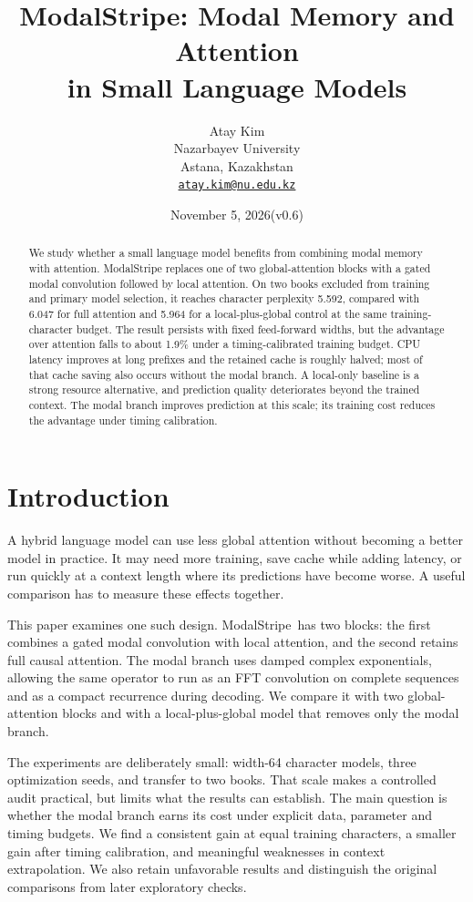 \documentclass[11pt,letterpaper]{article}
\title{ModalStripe: Modal Memory and Attention\\in Small Language Models}
\author{Atay Kim\\[3pt]\normalsize Nazarbayev University\\\normalsize Astana, Kazakhstan\\\normalsize\href{mailto:atay.kim@nu.edu.kz}{\texttt{atay.kim@nu.edu.kz}}}
\date{\small November 5, 2026\quad (v0.6)}
\newcommand{\model}{ModalStripe}
\begin{document}
\maketitle
\begin{abstract}
We study whether a small language model benefits from combining modal memory with attention. ModalStripe replaces one of two global-attention blocks with a gated modal convolution followed by local attention. On two books excluded from training and primary model selection, it reaches character perplexity 5.592, compared with 6.047 for full attention and 5.964 for a local-plus-global control at the same training-character budget. The result persists with fixed feed-forward widths, but the advantage over attention falls to about 1.9\% under a timing-calibrated training budget. CPU latency improves at long prefixes and the retained cache is roughly halved; most of that cache saving also occurs without the modal branch. A local-only baseline is a strong resource alternative, and prediction quality deteriorates beyond the trained context. The modal branch improves prediction at this scale; its training cost reduces the advantage under timing calibration.
\end{abstract}

\section{Introduction}
A hybrid language model can use less global attention without becoming a better model in practice. It may need more training, save cache while adding latency, or run quickly at a context length where its predictions have become worse. A useful comparison has to measure these effects together.

This paper examines one such design. \model\ has two blocks: the first combines a gated modal convolution with local attention, and the second retains full causal attention. The modal branch uses damped complex exponentials, allowing the same operator to run as an FFT convolution on complete sequences and as a compact recurrence during decoding. We compare it with two global-attention blocks and with a local-plus-global model that removes only the modal branch.

The experiments are deliberately small: width-64 character models, three optimization seeds, and transfer to two books. That scale makes a controlled audit practical, but limits what the results can establish. The main question is whether the modal branch earns its cost under explicit data, parameter and timing budgets. We find a consistent gain at equal training characters, a smaller gain after timing calibration, and meaningful weaknesses in context extrapolation. We also retain unfavorable results and distinguish the original comparisons from later exploratory checks.
\end{document}
